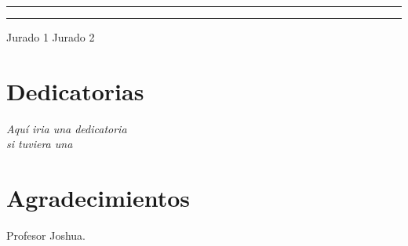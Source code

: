 \documentclass[12pt,letterpaper,openany]{book}
\begin{document}
\vspace*{1.3in}
\rule{60mm}{0.1mm} \hfill \rule{60mm}{0.1mm} \newline
Jurado 1 \hfill Jurado 2

\chapter*{Dedicatorias}
\begin{flushright}
\textit{Aquí iria una dedicatoria \\
si tuviera una}
\end{flushright}

\chapter*{Agradecimientos} %
 
Profesor Joshua.
\newpage
{}
\tableofcontents %
\end{document}
